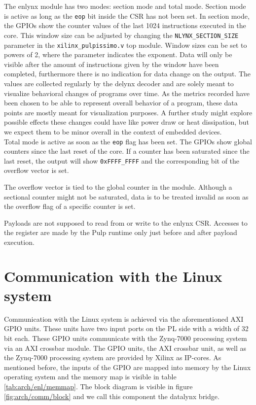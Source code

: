 \documentclass[../bachelor_paper.tex]{subfiles}
\begin{document}
The enlynx module has two modes: section mode and total mode. Section mode is active as long as the \texttt{eop} bit inside the \ac{CSR} has not been set. In section mode, the GPIOs show the counter values of the last 1024 instructions executed in the core. This window size can be adjusted by changing the \texttt{NLYNX\_SECTION\_SIZE}  parameter in the \texttt{xilinx\_pulpissimo.v} top module. Window sizes can be set to powers of 2, where the parameter indicates the exponent. Data will only be visible after the amount of instructions given by the window have been completed, furthermore there is no indication for data change on the output. The values are collected regularly by the delynx decoder and are solely meant to visualize behavioral changes of programs over time. As the metrics recorded have been chosen to be able to represent overall behavior of a program, these data points are mostly meant for visualization purposes. A further study might explore possible effects these changes could have like power draw or heat dissipation, but we expect them to be minor overall in the context of embedded devices.\\
Total mode is active as soon as the \texttt{eop} flag has been set. The GPIOs show global counters since the last reset of the core. If a counter has been saturated since the last reset, the output will show \texttt{0xFFFF\_FFFF} and the corresponding bit of the overflow vector is set.

The overflow vector is tied to the global counter in the module. Although a sectional counter might not be saturated, data is to be treated invalid as soon as the overflow flag of a specific counter is set.

Payloads are not supposed to read from or write to the enlynx \ac{CSR}. Accesses to the register are made by the Pulp runtime only just before and after payload execution.

\section{Communication with the Linux system}
Communication with the Linux system is achieved via the aforementioned AXI GPIO units. These units have two input ports on the \ac{PL} side with a width of 32 bit each. These GPIO units communicate with the Zynq\textsuperscript{\textregistered}-7000 processing system via an AXI crossbar module. The GPIO units, the AXI crossbar unit, as well as the Zynq\textsuperscript{\textregistered}-7000 processing system are provided by Xilinx\textsuperscript{\textregistered} as \ac{IP}-cores. As mentioned before, the inputs of the GPIO are mapped into memory by the Linux operating system and the memory map is visible in table \ref{tab:arch/enl/memmap}. The block diagram is visible in figure \ref{fig:arch/comm/block} and we call this component the datalynx bridge.
\end{document}
